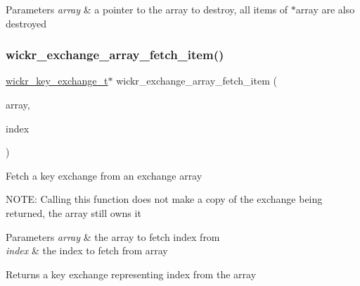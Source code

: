 \begin{DoxyParams}{Parameters}
{\em array} & a pointer to the array to destroy, all items of \textquotesingle{}$\ast$array\textquotesingle{} are also destroyed \\
\hline
\end{DoxyParams}
\mbox{\label{group__wickr__key__exchange_ga333510c3c7eeb8e33f94495de6bb122d}} 
\subsubsection{\texorpdfstring{wickr\_exchange\_array\_fetch\_item()}{wickr\_exchange\_array\_fetch\_item()}}
{\footnotesize\ttfamily \mbox{\hyperlink{structwickr__key__exchange}{wickr\+\_\+key\+\_\+exchange\+\_\+t}}$\ast$ wickr\+\_\+exchange\+\_\+array\+\_\+fetch\+\_\+item (\begin{DoxyParamCaption}\item[{wickr\+\_\+exchange\+\_\+array\+\_\+t $\ast$}]{array,  }\item[{uint32\+\_\+t}]{index }\end{DoxyParamCaption})}

Fetch a key exchange from an exchange array

N\+O\+TE\+: Calling this function does not make a copy of the exchange being returned, the array still owns it


\begin{DoxyParams}{Parameters}
{\em array} & the array to fetch \textquotesingle{}index\textquotesingle{} from \\
\hline
{\em index} & the index to fetch from \textquotesingle{}array\textquotesingle{} \\
\hline
\end{DoxyParams}
\begin{DoxyReturn}{Returns}
a key exchange representing \textquotesingle{}index\textquotesingle{} from the array 
\end{DoxyReturn}
\mbox{\label{group__wickr__key__exchange_ga907d700b76b748f80796b4404c7172c2}} 

